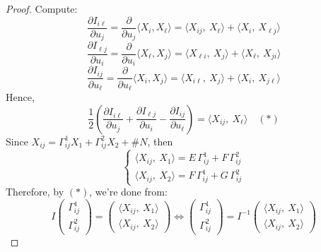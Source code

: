 \begin{proof}
Compute:
\[
\frac{\partial I_{i\ell}}{\partial u_j} = \frac{\partial}{\partial u_j}\big\langle X_i, X_\ell\big\rangle = \big\langle X_{ij},\ X_\ell\big\rangle + \big\langle X_i,\ X_{\ell j}\big\rangle
\]
\[
\frac{\partial I_{\ell j}}{\partial u_i} = \frac{\partial}{\partial u_i}\big\langle X_\ell, X_j\big\rangle = \big\langle X_{\ell i},\ X_j\big\rangle + \big\langle X_\ell,\ X_{ji}\big\rangle
\]
\[
\frac{\partial I_{ij}}{\partial u_\ell} = \frac{\partial}{\partial u_\ell}\big\langle X_i, X_j\big\rangle = \big\langle X_{i\ell},\ X_j\big\rangle + \big\langle X_i,\ X_{j\ell}\big\rangle
\]
Hence,
\[
\frac{1}{2}\left(\frac{\partial I_{i\ell}}{\partial u_j} + \frac{\partial I_{\ell j}}{\partial u_i} - \frac{\partial I_{ij}}{\partial u_\ell}\right) = \big\langle X_{ij},\ X_\ell\big\rangle \quad (*)
\]
Since $X_{ij} = \Gamma_{ij}^1X_1 + \Gamma_{ij}^2X_2 + \#N$, then
\[
\begin{cases}
\big\langle X_{ij},\ X_1\big\rangle = E\,\Gamma_{ij}^1 + F\,\Gamma_{ij}^2\\[2mm]
\big\langle X_{ij},\ X_2\big\rangle = F\,\Gamma_{ij}^1 + G\,\Gamma_{ij}^2
\end{cases}
\]
Therefore, by $(*)$, we're done from:
\[
I\begin{pmatrix}\Gamma_{ij}^1\\ \Gamma_{ij}^2\end{pmatrix} = \begin{pmatrix}\langle X_{ij},\ X_1\rangle\\ \langle X_{ij},\ X_2\rangle\end{pmatrix} \iff \begin{pmatrix}\Gamma_{ij}^1\\ \Gamma_{ij}^2\end{pmatrix} = I^{-1}\begin{pmatrix}\langle X_{ij},\ X_1\rangle\\ \langle X_{ij},\ X_2\rangle\end{pmatrix}
\]
\end{proof}

